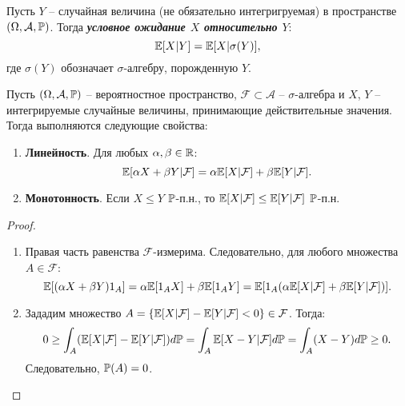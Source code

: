\begin{defn}
	Пусть $Y$ -- случайная величина (не обязательно интегригруемая) в пространстве $(\Omega, \mathcal{A}, \mathbb{P})$. Тогда \textbf{\textit{условное ожидание $X$ относительно $Y$}}:
	\[ \mathbb{E}[X|Y]=\mathbb{E}[X|\sigma(Y)], \]
	где $\sigma(Y)$ обозначает $\sigma$-алгебру, порожденную $Y$.
\end{defn}

\begin{lmm} \label{Properties of conditional expectation}
	Пусть $(\Omega, \mathcal{A}, \mathbb{P})$ -- вероятностное пространство, $\mathcal{F} \subset \mathcal{A}$ -- $\sigma$-алгебра и $X$, $Y$ -- интегрируемые случайные величины, принимающие действительные значения. Тогда выполняются следующие свойства:
	\begin{enumerate}
		\item \textbf{Линейность}. Для любых $\alpha, \beta \in \mathbb{R}$:
		\[ \mathbb{E}[\alpha X + \beta Y | \mathcal{F}]=\alpha \mathbb{E}[X|\mathcal{F}]+\beta \mathbb{E}[Y|\mathcal{F}]. \]
		\item \textbf{Монотонность}. Если $X \leq Y$ $\mathbb{P}$-п.н., то $\mathbb{E}[X|\mathcal{F}] \leq \mathbb{E}[Y|\mathcal{F}]$ $\mathbb{P}$-п.н.
	\end{enumerate}
\end{lmm}
\begin{proof}
		\begin{enumerate}
		\item Правая часть равенства $\mathcal{F}$-измерима. Следовательно, для любого множества $A \in \mathcal{F}$:
		\[ \mathbb{E}[(\alpha X + \beta Y)1_A]=\alpha \mathbb{E}[1_A X]+\beta \mathbb{E}[1_A Y]=\mathbb{E}[1_A(\alpha \mathbb{E}[X|\mathcal{F}] + \beta \mathbb{E}[Y|\mathcal{F}])]. \]
		\item Зададим множество $ A= \{ \mathbb{E}[X|\mathcal{F}] - \mathbb{E}[Y|\mathcal{F}] <0 \} \in \mathcal{F}$. Тогда:
		\[ 0 \geq \int_A (\mathbb{E}[X|\mathcal{F}] - \mathbb{E}[Y|\mathcal{F}]) d\mathbb{P} = \int_A \mathbb{E}[X-Y|\mathcal{F}]d\mathbb{P} = \int_A (X-Y) d\mathbb{P} \geq 0. \]
		Следовательно, $\mathbb{P}(A)=0$.
	\end{enumerate}
\end{proof}

